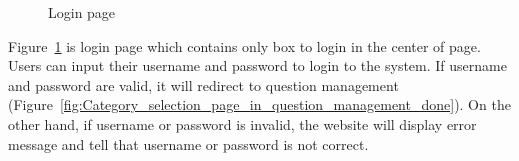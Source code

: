 \documentclass[12pt,oneside,openright,a4paper]{cpe-english-project}
\begin{document}
		\begin{figure}[!h]\centering
			\caption{Login page}\label{fig:Login_page_done}
		\end{figure}
		\begin{flushleft}
			Figure~\ref*{fig:Login_page_done} is login page which contains only box to login in the center of page. Users can input their username and password to login to the system. If username and password are valid, it will redirect to question management (Figure~\ref*{fig:Category_selection_page_in_question_management_done}). On the other hand, if username or password is invalid, the website will display error message and tell that username or password is not correct.
		\end{flushleft}
\end{document}

